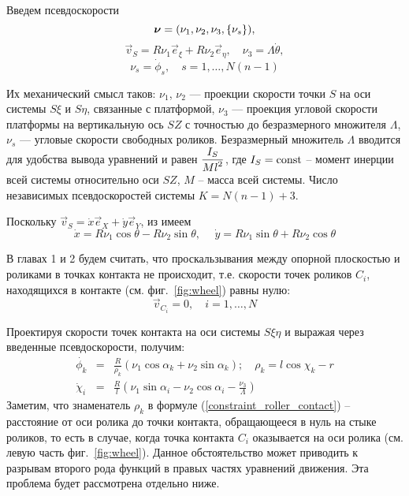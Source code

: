 Введем псевдоскорости
$$
    \boldsymbol{\mathbf{\nu}} = (\nu_1, \nu_2, \nu_3, \left\{\nu_s\right\}),
$$
\begin{equation}\label{eq:vsnu3}
    \vec{v}_S = R\nu_1\vec{e}_\xi + R\nu_2\vec{e}_\eta, \quad \nu_3 = \Lambda\dot{\theta},
\end{equation}
\begin{equation}\label{eq:nus}
    \nu_s = \dot{\phi}_s, \quad s = 1,\ldots,N(n-1)
\end{equation}

Их механический смысл таков: $\nu_1$, $\nu_2$ --- проекции скорости точки $S$ на оси системы $S\xi$ и $S\eta$, связанные с платформой, $\nu_3$ --- проекция угловой скорости платформы на вертикальную ось $SZ$ с точностью до безразмерного множителя $\Lambda$, $\nu_s$ --- угловые скорости свободных роликов. Безразмерный множитель $\Lambda$ вводится для удобства вывода уравнений и равен $\displaystyle\frac{\displaystyle I_S}{\displaystyle M l^2}$, где $I_S = \mathrm{const}$ -- момент инерции всей системы относительно оси $SZ$, $M$ -- масса всей системы. Число независимых псевдоскоростей системы $K = N(n-1)+3$.

Поскольку $\vec{v}_S = \dot{x}\vec{e}_X + \dot{y}\vec{e}_Y$, из имеем
\begin{equation}\label{eq:constraints_xy}
    \dot{x} = R \nu_1\cos\theta-R\nu_2\sin\theta, \hspace{15pt} \dot{y} = R\nu_1\sin\theta+R\nu_2\cos\theta
\end{equation}

В главах 1 и 2 будем считать, что проскальзывания между опорной плоскостью и роликами в точках контакта не происходит, т.е. скорости точек роликов $C_i$, находящихся в контакте (см. фиг.~\ref{fig:wheel}) равны нулю:
\begin{equation}\label{eq:constraints_vec}
    \vec{v}_{C_i} = 0,\quad i = 1,\dots, N    
\end{equation}

Проектируя скорости точек контакта на оси системы $S\xi\eta$ и выражая через введенные псевдоскорости, получим:
\begin{eqnarray}
    \dot{\phi_k} &=& \frac{R}{\rho_k }\left(\nu_1\cos\alpha_k + \nu_2\sin\alpha_k\right); \quad \rho_k  = l\cos\chi_k - r \label{constraint_roller_contact} \\
    \dot{\chi}_i &=& \frac{R}{l}\left(\nu_1\sin\alpha_i - \nu_2\cos\alpha_i - \frac{\nu_3}{\Lambda}\right)\label{constraint_wheel_contact}
\end{eqnarray}
Заметим, что знаменатель $\rho_k$ в формуле (\ref{constraint_roller_contact}) -- расстояние от оси ролика до точки контакта, обращающееся в нуль на стыке роликов, то есть в случае, когда точка контакта $C_i$ оказывается на оси ролика (см. левую часть фиг.~\ref{fig:wheel}). Данное обстоятельство может приводить к разрывам второго рода функций в правых частях уравнений движения. Эта проблема будет рассмотрена отдельно ниже.


